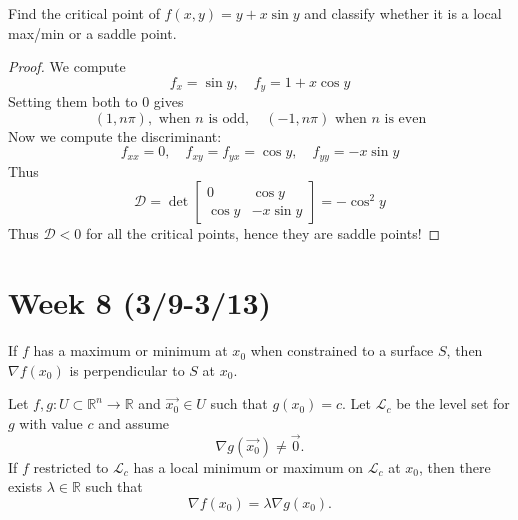 \documentclass[openany]{book}
\begin{document}
\begin{prob}
    Find the critical point of $f(x,y)=y+x\sin y$ and classify whether it is a local max/min or a saddle point.
\end{prob}
\begin{proof}
    We compute 
    \begin{equation*}
        f_x=\sin y, \quad f_y=1+x\cos y
    \end{equation*}
    Setting them both to $0$ gives 
    \begin{equation*}
        (1, n\pi), \text{ when $n$ is odd}, \quad (-1,n\pi) \text{ when $n$ is even}
    \end{equation*}
    Now we compute the discriminant:
    \begin{equation*}
        f_{xx}=0, \quad f_{xy}=f_{yx}=\cos y, \quad f_{yy}=-x\sin y
    \end{equation*}
    Thus 
    \begin{equation*}
        \mathcal{D}=\det\begin{bmatrix}
            0&\cos y\\
            \cos y&-x\sin y
        \end{bmatrix}=-\cos^2y
    \end{equation*}
    Thus $\mathcal{D}<0$ for all the critical points, hence they are saddle points!
\end{proof}


\newpage

\section*{\centering Week 8 (3/9-3/13)}

\begin{prop}
    If $f$ has a maximum or minimum
    at $x_0$ when constrained to a surface $S$, then $\nabla f(x_0)$ is perpendicular to $S$ at $x_0$.
\end{prop}
\begin{prop}
Let \( f, g : U \subset \mathbb{R}^n \to \mathbb{R} \) and \(\vec{x_0} \in U\) such that \( g({x_0}) = c \). Let \( \mathcal{L}_c \) be the level set for \( g \) with value \( c \) and assume  
\[
\nabla g(\vec{x_0}) \neq \vec{0}.
\] 
If \( f \) restricted to \( \mathcal{L}_c \) has a local minimum or maximum on \( \mathcal{L}_c \) at \( {x_0} \), then there exists \( \lambda \in \mathbb{R} \) such that  
\[
\nabla f({x_0}) = \lambda \nabla g({x_0}).
\]
\end{prop}
\end{document}
